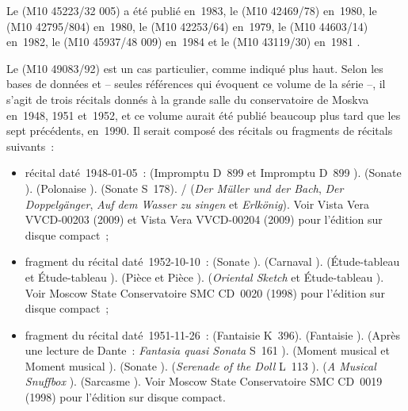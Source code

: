 Le  (M10 45223/32 005) a été publié en~1983, le  (M10
42469/78) en~1980, le  (M10 42795/804) en~1980, le  (M10
42253/64) en~1979, le  (M10 44603/14) en~1982, le  (M10
45937/48 009) en~1984 et le  (M10 43119/30) en~1981
\citep[voir][]{Rockdisco}.

Le  (M10 49083/92) est un cas particulier, comme indiqué plus
haut.
Selon les bases de données \citet{Recordssu} et \citet{Rockdisco} -- seules
références qui évoquent ce  volume de la série --, il s'agit
de trois récitals donnés à la grande salle du conservatoire de Moskva
en~1948, 1951 et~1952, et ce volume aurait été publié beaucoup plus tard que
les sept précédents, en~1990.
Il serait composé des récitals ou fragments de récitals suivants~:
\begin{itemize}
 \item
 récital daté~1948-01-05~: \Schubert{} (Impromptu D~899  et
 Impromptu D~899 ).
 \Schumann{} (Sonate ).
 \Chopin{} (Polonaise ).
 \Liszt{} (Sonate S~178).
 \Schubert{}/\Liszt{} (\emph{Der Müller und der Bach}, \emph{Der
 Doppelgänger}, \emph{Auf dem Wasser zu singen} et \emph{Erlkönig}).
 Voir Vista Vera VVCD-00203 (2009) et Vista Vera VVCD-00204 (2009) pour
 l'édition sur disque compact~;
 \item
 fragment du récital daté~1952-10-10~: \Beethoven{} (Sonate ).
 \Schumann{} (Carnaval ).
 \Rachmaninov{} (Étude-tableau   et Étude-tableau
  ).
 \Prokofiev{} (Pièce   et Pièce  ).
 \Rachmaninov{} (\emph{Oriental Sketch} et Étude-tableau 
 ).
 Voir Moscow State Conservatoire SMC CD~0020 (1998) pour l'édition sur
 disque compact~;
 \item
 fragment du récital daté~1951-11-26~: \Mozart{} (Fantaisie K~396).
 \Schumann{} (Fantaisie ).
 \Liszt{} (Après une lecture de Dante~: \emph{Fantasia quasi Sonata} S~161
 ).
 \Rachmaninov{} (Moment musical   et Moment musical
  ).
 \Scriabine{} (Sonate ).
 \Debussy{} (\emph{Serenade of the Doll} L~113 ).
 \Liadov{} (\emph{A Musical Snuffbox} ).
 \Prokofiev{} (Sarcasme  ).
 Voir Moscow State Conservatoire SMC CD~0019 (1998) pour l'édition sur
 disque compact.
\end{itemize}

